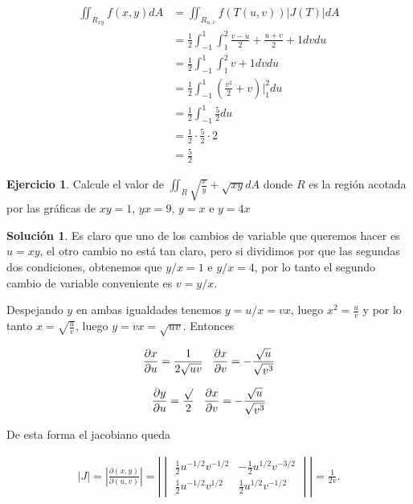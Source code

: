 \documentclass{article}
\theoremstyle{plain}
\theoremstyle{definition}
\newtheorem{ejer}[thm]{Ejercicio}
\newtheorem{sol}[thm]{Solución}
\begin{document}
\begin{align*}
    \iint_{R_{xy}} f(x,y)dA &=  \iint_{R_{u,v}} f(T(u,v)) |J(T)|dA \\
    &=  \frac{1}{2}\int_{-1}^1\int_1^2  \frac{v-u}{2} +\frac{u+v}{2} +1 dvdu \\
    &=  \frac{1}{2}\int_{-1}^1\int_1^2  v +1 dvdu \\
    &= \frac{1}{2} \int_{-1}^1\left( \frac{v^2}{2}+v\right)\bigg|_1^2 du \\
    &= \frac{1}{2} \int_{-1}^1 \frac{5}{2}du \\
    &= \frac{1}{2} \cdot \frac{5}{2} \cdot 2 \\
    &= \frac{5}{2}
\end{align*}


\begin{ejer}Calcule el valor de $\displaystyle \iint_{R} \sqrt{\frac{x}{y}}+ \sqrt{xy} dA$ donde $R$ es la regi\'on acotada por las gr\'aficas de $xy=1$, $yx=9$, $y=x$ e $y=4x$ \\
\end{ejer}

\begin{sol}Es claro que uno de los cambios de variable que queremos hacer es $u=xy$, el otro cambio no est\'a tan claro, pero si dividimos por que las segundas dos condiciones, obtenemos que $y/x= 1$ e $y/x=4$, por lo tanto el segundo cambio de variable conveniente es $v= y/x$. \\
\end{sol}

Despejando $y$ en ambas igualdades tenemos $y=u/x=vx$, luego $x^2=\displaystyle \frac{u}{v}$ y por lo tanto $\displaystyle x =\sqrt{\frac{u}{v}}$, luego $y = \displaystyle vx = \sqrt{uv}$. Entonces

\begin{align*}
    \frac{\partial x}{\partial u} = \frac{1}{2\sqrt{uv}} \hspace{0.3cm}   \frac{\partial x}{\partial v} = -\frac{\sqrt{u}}{\sqrt{v^3}}
\end{align*}

\begin{align*}
    \frac{\partial y}{\partial u} = \frac{\sqrt{}}{2} \hspace{0.3cm}   \frac{\partial x}{\partial v} = -\frac{\sqrt{u}}{\sqrt{v^3}}
\end{align*}



De esta forma el jacobiano queda

\begin{align*}
|J| = \left| \frac{\partial(x, y)}{\partial(u, v)} \right|
= \left|
\begin{vmatrix}
\frac{1}{2} u^{-1/2} v^{-1/2} & -\frac{1}{2} u^{1/2} v^{-3/2} \\
\frac{1}{2} u^{-1/2} v^{1/2} & \frac{1}{2} u^{1/2} v^{-1/2}
\end{vmatrix}
\right|
= \frac{1}{2v}.
\end{align*}
\end{document}
